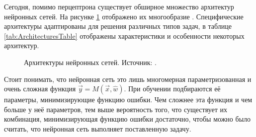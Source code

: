 \par
Сегодня, помимо перцептрона существует обширное множество архитектур нейронных сетей. На рисунке \ref{ris:NNArchitectures} отображено их многообразие \cite{leijnen2020neural}. Специфические архитектуры адаптированы для решения различных типов задач, в таблице \ref{tab:ArchitecturesTable} отображены характеристики и особенности некоторых архитектур.
\begin{figure}[htbp]
	\caption{Архитектуры нейронных сетей. Источник: \cite{leijnen2020neural}.}
	\label{ris:NNArchitectures}
\end{figure}

\par
Стоит понимать, что нейронная сеть это лишь многомерная параметризованная и очень сложная функция $\vec{y} = M(\vec{x}, \hat{w})$. При обучении подбираются её параметры, минимизирующие функцию ошибки. Чем сложнее эта функция и чем больше у неё параметров, тем выше вероятность того, что существует их комбинация, минимизирующая функцию ошибки достаточно, чтобы можно было считать, что нейронная сеть выполняет поставленную задачу.


